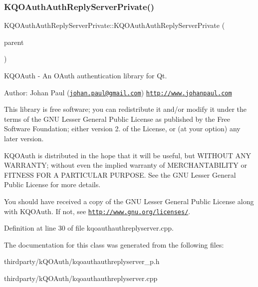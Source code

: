 \subsubsection{\texorpdfstring{K\+Q\+O\+Auth\+Auth\+Reply\+Server\+Private()}{KQOAuthAuthReplyServerPrivate()}}
{\footnotesize\ttfamily K\+Q\+O\+Auth\+Auth\+Reply\+Server\+Private\+::\+K\+Q\+O\+Auth\+Auth\+Reply\+Server\+Private (\begin{DoxyParamCaption}\item[{\hyperlink{class_k_q_o_auth_auth_reply_server}{K\+Q\+O\+Auth\+Auth\+Reply\+Server} $\ast$}]{parent }\end{DoxyParamCaption})}

K\+Q\+O\+Auth -\/ An O\+Auth authentication library for Qt.

Author\+: Johan Paul (\href{mailto:johan.paul@gmail.com}{\tt johan.\+paul@gmail.\+com}) \href{http://www.johanpaul.com}{\tt http\+://www.\+johanpaul.\+com}

This library is free software; you can redistribute it and/or modify it under the terms of the G\+NU Lesser General Public License as published by the Free Software Foundation; either version 2. of the License, or (at your option) any later version.

K\+Q\+O\+Auth is distributed in the hope that it will be useful, but W\+I\+T\+H\+O\+UT A\+NY W\+A\+R\+R\+A\+N\+TY; without even the implied warranty of M\+E\+R\+C\+H\+A\+N\+T\+A\+B\+I\+L\+I\+TY or F\+I\+T\+N\+E\+SS F\+OR A P\+A\+R\+T\+I\+C\+U\+L\+AR P\+U\+R\+P\+O\+SE. See the G\+NU Lesser General Public License for more details.

You should have received a copy of the G\+NU Lesser General Public License along with K\+Q\+O\+Auth. If not, see \href{http://www.gnu.org/licenses/}{\tt http\+://www.\+gnu.\+org/licenses/}. 

Definition at line 30 of file kqoauthauthreplyserver.\+cpp.



The documentation for this class was generated from the following files\+:\begin{DoxyCompactItemize}
\item 
thirdparty/k\+Q\+O\+Auth/kqoauthauthreplyserver\+\_\+p.\+h\item 
thirdparty/k\+Q\+O\+Auth/kqoauthauthreplyserver.\+cpp\end{DoxyCompactItemize}
